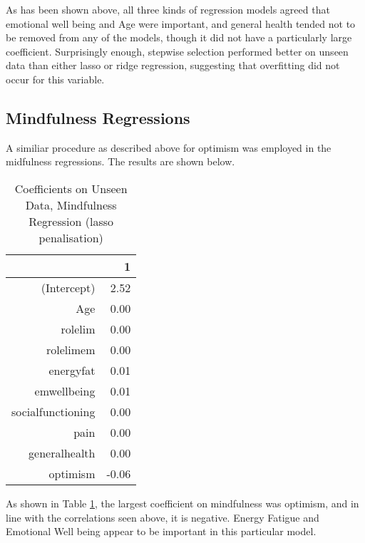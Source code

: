 \documentclass{article}
\begin{document}







As has been shown above, all three kinds of regression models agreed that emotional well being and Age were important, and general health tended not to be removed from any of the models, though it did not have a particularly large coefficient. Surprisingly enough, stepwise selection performed better on unseen data than either lasso or ridge regression, suggesting that overfitting did not occur for this variable. 




\subsection{Mindfulness Regressions}

A similiar procedure as described above for optimism was employed
in the midfulness regressions.  The results are shown below.




\begin{table}[ht]
\centering
\begin{tabular}{rr}
  \hline
 & 1 \\ 
  \hline
(Intercept) & 2.52 \\ 
  Age & 0.00 \\ 
  rolelim & 0.00 \\ 
  rolelimem & 0.00 \\ 
  energyfat & 0.01 \\ 
  emwellbeing & 0.01 \\ 
  socialfunctioning & 0.00 \\ 
  pain & 0.00 \\ 
  generalhealth & 0.00 \\ 
  optimism & -0.06 \\ 
   \hline
\end{tabular}
\caption{Coefficients on Unseen Data, Mindfulness Regression (lasso penalisation)} 
\label{tab:hom1mindlasso}
\end{table}
As shown in Table \ref{tab:hom1mindlasso}, the largest coefficient on mindfulness was optimism, and in line with the correlations seen above, it is negative. Energy Fatigue and Emotional Well being appear to be important in this particular model. 
\end{document}
